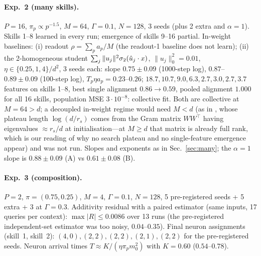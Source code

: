 \paragraph{Exp.~2 (many skills).} $P=16$, $\pi_p\propto p^{-1.5}$, $M=64$, $\Gamma=0.1$, $N=128$, 3 seeds (plus 2 extra and $\alpha=1$).
Skills 1--8 learned in every run; emergence of skills 9--16 partial. In-weight baselines: (i) readout $\rho=\sum_pa_p/M$ (the readout-1 baseline does not learn); (ii) the 2-homogeneous student
$\sum_j\|u_j\|^2\sigma_2(\hat u_j\cdot x)$, $\|u_j\|^2_0=0.01$, $\eta\in\{0.25,1,4\}/d^2$, 3 seeds each: slope $0.75\pm0.09$ (1000-step log),
$0.87$--$0.89\pm0.09$ (100-step log), $T_p\eta a_p=0.23$--$0.26$; $18.7,10.7,9.0,6.3,2.7,3.0,2.7,3.7$ features on skills 1--8, best single
alignment $0.86\to0.59$, pooled alignment $1.000$ for all 16 skills, population MSE $3\cdot10^{-8}$: collective fit. Both are collective at
$M=64>d$; a decoupled in-weight regime would need $M<d$ (as in \citet{benarous2025quadratic}, whose plateau length $\log(d/r_s)$ comes from
the Gram matrix $WW^\top$ having eigenvalues $\approx r_s/d$ at initialisation---at $M\ge d$ that matrix is already full rank, which is our reading
of why no search plateau and no single-feature emergence appear) and was not run. Slopes and exponents as in Sec.~\ref{sec:many}; the $\alpha=1$ slope is $0.88\pm0.09$ (A) vs
$0.61\pm0.08$ (B).

\paragraph{Exp.~3 (composition).} $P=2$, $\pi=(0.75,0.25)$, $M=4$, $\Gamma=0.1$, $N=128$, 5 pre-registered seeds + 5 extra + 3 at $\Gamma=0.3$.
Additivity residual with a paired estimator (same inputs, 17 queries per context): $\max|R|\le0.0086$ over 13 runs (the pre-registered
independent-set estimator was too noisy, $0.04$--$0.35$). Final neuron assignments (skill~1, skill~2): $(4,0),(2,2),(2,2),(2,1),(2,2)$ for
the pre-registered seeds. Neuron arrival times $T\approx K/(\eta\pi_pm_0^2)$ with $K=0.60$ ($0.54$--$0.78$).

